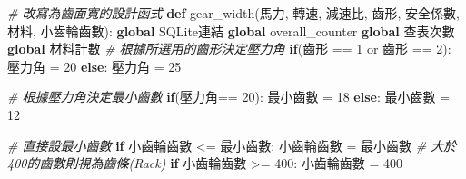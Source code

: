 \documentclass[]{article}
\newenvironment{Shaded}{}{}
\newcommand{\KeywordTok}[1]{\textcolor[rgb]{0.00,0.44,0.13}{\textbf{{#1}}}}
\newcommand{\DecValTok}[1]{\textcolor[rgb]{0.25,0.63,0.44}{{#1}}}
\newcommand{\CommentTok}[1]{\textcolor[rgb]{0.38,0.63,0.69}{\textit{{#1}}}}
\newcommand{\NormalTok}[1]{{#1}}
\begin{document}
\begin{Shaded}
\begin{Highlighting}[]
\CommentTok{# 改寫為齒面寬的設計函式}
\KeywordTok{def} \NormalTok{gear_width(馬力, 轉速, 減速比, 齒形, 安全係數, 材料, 小齒輪齒數):}
    \KeywordTok{global} \NormalTok{SQLite連結}
    \KeywordTok{global} \NormalTok{overall_counter}
    \KeywordTok{global} \NormalTok{查表次數}
    \KeywordTok{global} \NormalTok{材料計數}
    \CommentTok{# 根據所選用的齒形決定壓力角}
    \KeywordTok{if}\NormalTok{(齒形 == }\DecValTok{1} \NormalTok{or 齒形 == }\DecValTok{2}\NormalTok{):}
        \NormalTok{壓力角 = }\DecValTok{20}
    \KeywordTok{else}\NormalTok{:}
        \NormalTok{壓力角 = }\DecValTok{25}

    \CommentTok{# 根據壓力角決定最小齒數}
    \KeywordTok{if}\NormalTok{(壓力角== }\DecValTok{20}\NormalTok{):}
        \NormalTok{最小齒數 = }\DecValTok{18}
    \KeywordTok{else}\NormalTok{:}
        \NormalTok{最小齒數 = }\DecValTok{12}

    \CommentTok{# 直接設最小齒數}
    \KeywordTok{if} \NormalTok{小齒輪齒數 <= 最小齒數:}
        \NormalTok{小齒輪齒數 = 最小齒數}
    \CommentTok{# 大於400的齒數則視為齒條(Rack)}
    \KeywordTok{if} \NormalTok{小齒輪齒數 >= }\DecValTok{400}\NormalTok{:}
        \NormalTok{小齒輪齒數 = }\DecValTok{400}


\end{Highlighting}
\end{Shaded}
\end{document}
